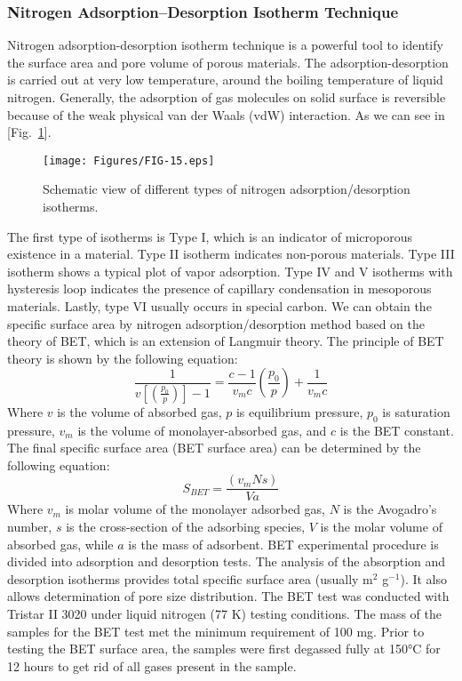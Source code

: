 \documentclass[reprint,amsmath,amssymb,aps,floatfix,
]{revtex4-2}
\begin{document}
\subsubsection{Nitrogen Adsorption–Desorption Isotherm Technique}
Nitrogen adsorption-desorption isotherm technique is a powerful tool to identify the surface area and pore volume of porous materials. The adsorption-desorption is carried out at very low temperature, around the boiling temperature of liquid nitrogen. Generally, the adsorption of gas molecules on solid surface is reversible because of the weak physical van der Waals (vdW) interaction. As we can see in [Fig.~\ref{fig:fig15}].
\begin{figure}[b]
    \centering
    \texttt{[image: Figures/FIG-15.eps]}
    \caption{\label{fig:fig15}Schematic view of different types of nitrogen adsorption/desorption isotherms.}
    \end{figure}
The first type of isotherms is Type I, which is an indicator of microporous existence in a material. Type II isotherm indicates non-porous materials. Type III isotherm shows a typical plot of vapor adsorption. Type IV and V isotherms with hysteresis loop indicates the presence of capillary condensation in mesoporous materials. Lastly, type VI usually occurs in special carbon. 
We can obtain the specific surface area by nitrogen adsorption/desorption method based on the theory of BET, which is an extension of Langmuir theory. The principle of BET theory is shown by the following equation:
\begin{equation}
    \frac{1}{v[(\frac{p_0}{p} )]-1} = \frac{c-1}{v_mc}(\frac{p_0}{p}) + \frac{1}{v_mc}    
\end{equation}
Where $v$ is the volume of absorbed gas, $p$ is equilibrium pressure, $p_0$ is saturation pressure, $v_m$ is the volume of monolayer-absorbed gas, and $c$ is the BET constant. The final specific surface area (BET surface area) can be determined by the following equation:
\begin{equation}
    S_{BET} = \frac{(v_mNs)}{Va}     
\end{equation}
Where $v_m$ is molar volume of the monolayer adsorbed gas, $N$ is the Avogadro's number, $s$ is the cross-section of the adsorbing species, $V$ is the molar volume of absorbed gas, while $a$ is the mass of adsorbent. BET experimental procedure is divided into adsorption and desorption tests. The analysis of the absorption and desorption isotherms provides total specific surface area (usually m$^2$ g$^{-1}$). It also allows determination of pore size distribution. The BET test was conducted with Tristar II 3020 under liquid nitrogen (77 K) testing conditions. The mass of the samples for the BET test met the minimum requirement of 100 mg. Prior to testing the BET surface area, the samples were first degassed fully at \ang{150}C for 12 hours to get rid of all gases present in the sample.
\end{document}
